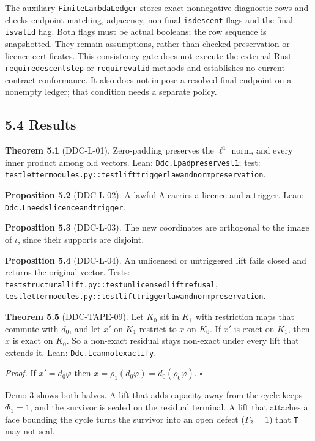 \documentclass[
  11pt,
]{article}
\renewcommand{\_}{\ddcunderscore\allowbreak}
\begin{document}
The auxiliary \texttt{Finite\allowbreak Lambda\allowbreak Ledger} stores exact nonnegative
diagnostic rows and checks endpoint matching, adjacency, non-final
\texttt{is\_descent} flags and the final \texttt{is\_valid} flag. Both
flags must be actual booleans; the row sequence is snapshotted. They
remain assumptions, rather than checked preservation or licence
certificates. This consistency gate does not execute the external Rust
\texttt{require\_descent\_step} or \texttt{require\_valid} methods and
establishes no current contract conformance. It also does not impose a
resolved final endpoint on a nonempty ledger; that condition needs a
separate policy.

\subsection{5.4 Results}\label{results-4}

\textbf{Theorem 5.1} (DDC-L-01). Zero-padding preserves the \(\ell^1\)
norm, and every inner product among old vectors. Lean:
\texttt{Ddc.\allowbreak L\_pad\_preserves\_l1}; test:
\texttt{test\_letter\_modules.\allowbreak py::test\_lift\_trigger\_law\_and\_norm\_preservation}.

\textbf{Proposition 5.2} (DDC-L-02). A lawful Λ carries a licence and a
trigger. Lean: \texttt{Ddc.\allowbreak L\_needs\_licence\_and\_trigger}.

\textbf{Proposition 5.3} (DDC-L-03). The new coordinates are orthogonal
to the image of \(\iota\), since their supports are disjoint.

\textbf{Proposition 5.4} (DDC-L-04). An unlicensed or untriggered lift
fails closed and returns the original vector. Tests:
\texttt{test\_structural\_lift.\allowbreak py::test\_unlicensed\_lift\_refusal},
\texttt{test\_letter\_modules.\allowbreak py::test\_lift\_trigger\_law\_and\_norm\_preservation}.

\textbf{Theorem 5.5} (DDC-TAPE-09). Let \(K_0\) sit in \(K_1\) with
restriction maps that commute with \(d_0\), and let \(x'\) on \(K_1\)
restrict to \(x\) on \(K_0\). If \(x'\) is exact on \(K_1\), then \(x\)
is exact on \(K_0\). So a non-exact residual stays non-exact under every
lift that extends it. Lean: \texttt{Ddc.\allowbreak L\_cannot\_exactify}.

\emph{Proof.} If \(x' = d_0 \varphi\) then
\(x = \rho_1(d_0 \varphi) = d_0(\rho_0 \varphi)\). \(\square\)

Demo 3 shows both halves. A lift that adds capacity away from the cycle
keeps \(\Phi_1 = 1\), and the survivor is sealed on the residual
terminal. A lift that attaches a face bounding the cycle turns the
survivor into an open defect (\(\Gamma_2 = 1\)) that \texttt{T} may not
seal.
\end{document}
